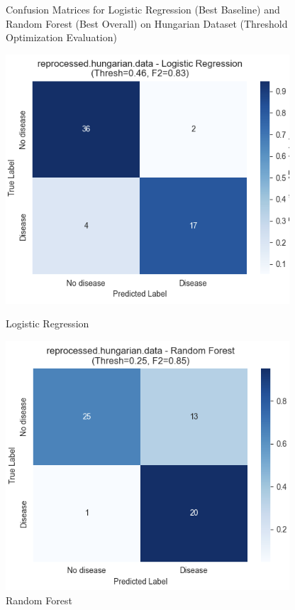 \documentclass{article}
\begin{document}
\begin{figure}[tbp]
    \caption{Confusion Matrices for Logistic Regression (Best Baseline) and Random Forest (Best Overall) on Hungarian Dataset (Threshold Optimization Evaluation)}
    \label{fig:confusion_matrices_hungarian_lr_rf}
     \begin{minipage}{0.48\textwidth}
        \centering
        \includegraphics[width=\textwidth]{plots/Hungarian_Logistic_Regression_CM.png}
        \caption*{Logistic Regression}
    \end{minipage}\hfill
    \begin{minipage}{0.48\textwidth}
        \includegraphics[width=\textwidth]{plots/Hungarian_Random_Forest_CM.png}
        \caption*{Random Forest}
    \end{minipage}
\end{figure}
\end{document}
